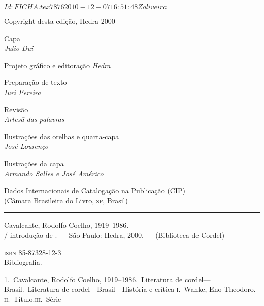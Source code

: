 \SVN $Id: FICHA.tex 7876 2010-12-07 16:51:48Z oliveira $

\pagebreak

\begingroup \fontsize{9pt}{0.7\baselineskip}\selectfont \parskip=0pt\thispagestyle{empty} 

\begin{center}
Copyright\raisebox{-1.2mm}{$^\copyright$}  desta edição, Hedra 2000\\\medskip

Capa\\
\textit{Julio Dui}\\\medskip

Projeto gráfico e editoração
\textit{Hedra}

Preparação de texto\\
\textit{Iuri Pereira}\\\medskip

Revisão\\
\textit{Artesã das palavras}\\\medskip

Ilustrações das orelhas e quarta-capa\\
\textit{José Lourenço}\\\medskip

Ilustrações da capa\\
\textit{Armando Salles e José Américo}\\\bigskip

\begin{minipage}{.8\textwidth}
\fontsize{7pt}{5pt}\selectfont
Dados Internacionais de Catalogação na Publicação (CIP)\\
(Câmara Brasileira do Livro, \textsc{sp}, Brasil)\\
\mbox{}\vspace{-0.2ex}\hrule\vspace{1ex}

Cavalcante, Rodolfo Coelho, 1919--1986.\\
\makeatletter\@autor / introdução de \@introdutor\makeatother.
--- São Paulo: Hedra, 2000. --- (Biblioteca de Cordel)\\\smallskip

\textsc{isbn} 85-87328-12-3\\

Bibliografia.

1.~Cavalcante, Rodolfo Coelho, 1919--1986.~Literatura
de cordel---Brasil.~Literatura de
cordel---Brasil---História e crítica\quad 
\textsc{i}.~Wanke, Eno Theodoro.\quad
\textsc{ii}.~Título.\quad \textsc{iii}.~Série\\\medskip


\end{minipage}
\end{center}
